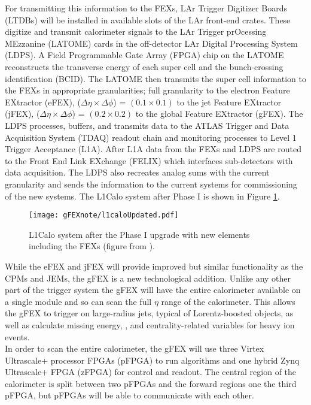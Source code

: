 For transmitting this information to the FEXs, LAr Trigger Digitizer Boards (LTDBs) will be installed in available slots of the LAr front-end crates.  These digitize and transmit calorimeter signals to the LAr Trigger prOcessing MEzzanine (LATOME) cards in the off-detector LAr Digital Processing System (LDPS).  A Field Programmable Gate Array (FPGA) chip on the LATOME  reconstructs the transverse energy of each super cell and the bunch-crossing identification (BCID).  The LATOME then transmits the super cell information to the FEXs in appropriate granularities; full granularity to the electron Feature EXtractor (eFEX), ($\Delta \eta \times \Delta \phi $) = $(0.1 \times 0.1)$ to the jet Feature EXtractor (jFEX), ($\Delta \eta \times \Delta \phi $) = $(0.2 \times 0.2)$ to the global Feature EXtractor (gFEX).  The LDPS processes, buffers, and transmits data to the ATLAS Trigger and Data Acquisition System (TDAQ) readout chain and monitoring processes to Level 1 Trigger Acceptance (L1A).  After L1A data from the FEXs and LDPS are routed to the Front End Link EXchange (FELIX) which interfaces sub-detectors with data acquisition.  The LDPS also recreates analog sums with the current granularity and sends the information to the current systems for commissioning of the new systems.  The L1Calo system after Phase I is shown in Figure \ref{fig:l1calo}.\\

\begin{figure} [h!]
\centering
\texttt{[image: gFEXnote/l1caloUpdated.pdf]} 
\caption[L1Calo system after the Phase I upgrade]{\label{fig:l1calo}{L1Calo system after the Phase I upgrade with new elements including the FEXs (figure from \cite{gFEXFDR}).}}
\end{figure}

While the eFEX and jFEX will provide improved but similar functionality as the CPMs and JEMs, the gFEX is a new technological addition.  Unlike any other part of the trigger system the gFEX will have the entire calorimeter available on a single module and so can scan the full $\eta$ range of the calorimeter.  This allows the gFEX to trigger on large-radius jets, typical of Lorentz-boosted objects, as well as calculate missing energy, \met, and centrality-related variables for heavy ion events. \\

In order to scan the entire calorimeter, the gFEX will use three Virtex Ultrascale+ processor FPGAs (pFPGA) to run algorithms and one hybrid Zynq Ultrascale+ FPGA (zFPGA) for control and readout\cite{gFEXFDR}.  The central region of the calorimeter is split between two pFPGAs and the forward regions one the third pFPGA, but pFPGAs will be able to communicate with each other.    \\

